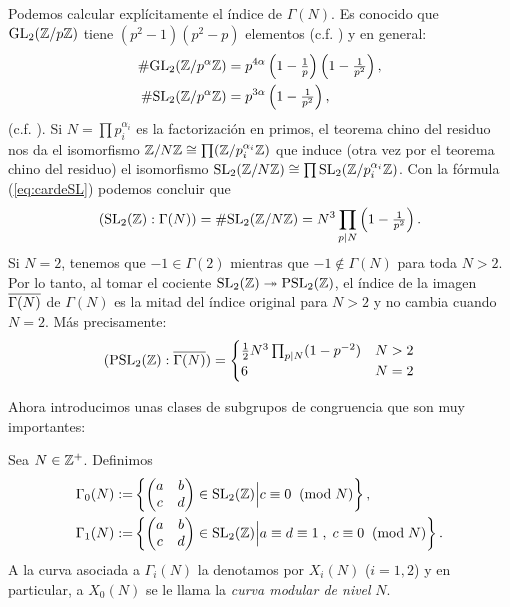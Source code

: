 Podemos calcular expl\'icitamente el \'indice de $\Gamma(N)$. Es conocido que $\mathrm{GL}_2(\mathbb{Z}/p\mathbb{Z})$
tiene $(p^2-1)(p^2-p)$ elementos (c.f. \cite[Teorema 8.5, pg 219]{RotmanAITTTOG}) y en general:
\begin{align}
  \#\mathrm{GL}_2(\mathbb{Z}/p^{\alpha}\mathbb{Z})&=p^{4\alpha}\left( 1-\tfrac{1}{p} \right)\left( 1-\tfrac{1}{p^2} \right),\nonumber\\
  \#\mathrm{SL}_2(\mathbb{Z}/p^{\alpha}\mathbb{Z})&=p^{3\alpha}\left( 1-\tfrac{1}{p^2} \right),\label{eq:cardeSL}
\end{align}
(c.f. \cite[\S1.6]{ShimuraITTATOAF}). Si $N=\prod p_i^{\alpha_i}$ es la factorizaci\'on en primos,
el teorema chino del residuo nos da el isomorfismo $\mathbb{Z}/N\mathbb{Z}\cong\prod (\mathbb{Z}/p_i^{\alpha_i}\mathbb{Z})$
que induce (otra vez por el teorema chino del residuo) el isomorfismo
$\mathrm{SL}_2(\mathbb{Z}/N\mathbb{Z})\cong\prod \mathrm{SL}_2(\mathbb{Z}/p_i^{\alpha_i}\mathbb{Z})$. Con la f\'ormula (\ref{eq:cardeSL})
podemos concluir que
\begin{equation}\label{eq:indiceGammaN}
  (\mathrm{SL}_2(\mathbb{Z}):\Gamma(N))=\#\mathrm{SL}_2(\mathbb{Z}/N\mathbb{Z})=N^3\prod_{p\mid N}\left( 1-\tfrac{1}{p^2} \right).
\end{equation}
Si $N=2$, tenemos que $-1\in\Gamma(2)$ mientras que $-1\not\in\Gamma(N)$ para toda $N>2$.
Por lo tanto, al tomar el cociente $\mathrm{SL}_2(\mathbb{Z})\twoheadrightarrow\mathrm{PSL}_2(\mathbb{Z})$, el \'indice de la imagen
$\overline{\Gamma(N)}$ de $\Gamma(N)$ es la mitad del \'indice original para $N>2$ y no cambia cuando
$N=2$. M\'as precisamente:
\[
  (\mathrm{PSL}_2(\mathbb{Z}):\overline{\Gamma(N)})=
  \begin{cases}
    \tfrac{1}{2}N^3\prod_{p\mid N}(1-p^{-2}) &N>2\\
    6 &N=2
  \end{cases}
\]

Ahora introducimos unas clases de subgrupos de congruencia que son muy importantes:

\begin{defin}
  Sea $N\in\mathbb{Z}^+$. Definimos
  \begin{align*}
    \Gamma_0(N):=&\left\{ \begin{pmatrix}a & b\\ c & d\end{pmatrix}\in\mathrm{SL}_2(\mathbb{Z})\Big| c\equiv 0\;\;(\mathrm{mod}\; N)\right\},\\
    \Gamma_1(N):=&
    \left\{ \begin{pmatrix}a & b\\ c & d\end{pmatrix}\in\mathrm{SL}_2(\mathbb{Z})\Big| a\equiv d\equiv1\;,\;c\equiv 0\;\;(\mathrm{mod}\; N)\right\}.
  \end{align*}
  A la curva asociada a $\Gamma_i(N)$ la denotamos por $X_i(N)$ ($i=1,2$) y en particular, a $X_0(N)$
  se le llama la \emph{curva modular de nivel} $N$. 
\end{defin}

